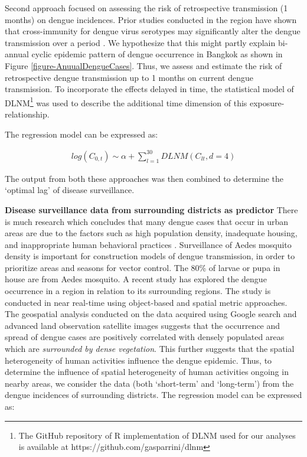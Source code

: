 \documentclass{bmcart}
\begin{document}
Second approach focused on assessing the risk of retrospective transmission (1 months) on dengue incidences. Prior studies conducted in the region have shown that cross-immunity for dengue virus serotypes may significantly alter the dengue transmission over a period \cite{adams2006cross,reich2013interactions}. We hypothesize that this might partly explain bi-annual cyclic epidemic pattern of dengue occurrence in Bangkok as shown in Figure \ref{figure-AnuualDengueCases}. Thus, we assess and estimate the risk of retrospective dengue transmission up to 1 months on current dengue transmission. To incorporate the effects delayed in time, the statistical model of DLNM\footnote{The GitHub repository of R implementation of DLNM used for our analyses is available at https://github.com/gasparrini/dlnm} was used to describe the additional time dimension of this exposure-relationship\cite{gasparrini2010distributed}. 

The regression model can be expressed as:

\begin{equation}
\begin{aligned}
\label{eq:long}
log (C_{0,t}) \sim \alpha + \sum_{l=1}^{30} DLNM(C_ {lt}, d = 4) 
\end{aligned}
\end{equation}


The output from both these approaches was then combined to determine the `optimal lag' of disease surveillance. 

\textbf{Disease surveillance data from surrounding districts as predictor} There is much research which concludes that many dengue cases that occur in urban areas are due to the factors such as high population density, inadequate housing, and inappropriate human behavioral practices \cite{chang2009combining,knudsen1992vector,troyo2009urban}.  Surveillance of Aedes mosquito density is important for construction models of dengue transmission, in order to prioritize areas and seasons for vector control. The 80\% of larvae or pupa in house are from Aedes mosquito. A recent study \cite{sarfraz2014near} has explored the dengue occurrence in a region in relation to its surrounding regions. The study is conducted in near real-time using object-based and spatial metric approaches. The geospatial analysis conducted on the data acquired using Google search and advanced land observation satellite images suggests that the occurrence and spread of dengue cases are positively correlated with densely populated areas which are \textit{surrounded by dense vegetation}. This further suggests that the spatial heterogeneity of human activities influence the dengue epidemic. Thus, to determine the influence of spatial heterogeneity of human activities ongoing in nearby areas, we consider the data (both `short-term' and `long-term') from the dengue incidences of surrounding districts. The regression model can be expressed as:
\end{document}
